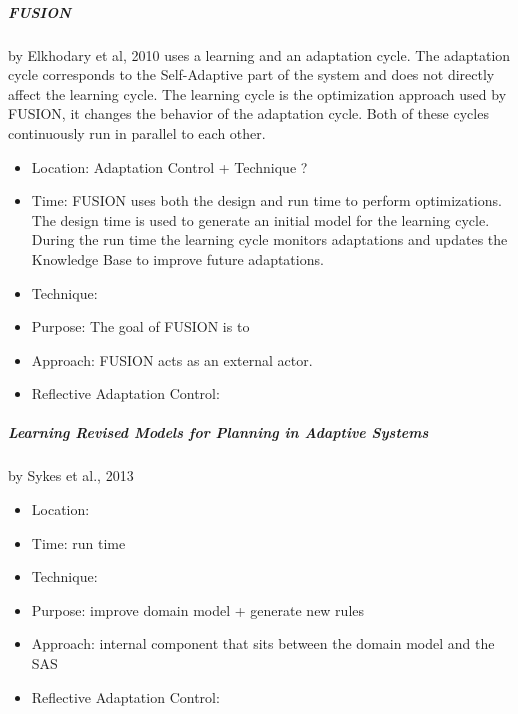 \subparagraph*{FUSION}
by Elkhodary et al, 2010 \cite*{FUSION}  uses a learning and an adaptation cycle.
The adaptation cycle corresponds to the Self-Adaptive part of the system
and does not directly affect the learning cycle.
The learning cycle is the optimization approach used by FUSION,
it changes the behavior of the adaptation cycle.
Both of these cycles continuously run in parallel to each other.
\begin{itemize}
    \item Location: Adaptation Control + Technique ?
    \item Time: FUSION uses both the design and run time to perform optimizations.
    The design time is used to generate an initial model for the learning cycle.
    During the run time the learning cycle monitors adaptations
    and updates the Knowledge Base to improve future adaptations.
    \item Technique:
    \item Purpose: The goal of FUSION is to 
    \item Approach: FUSION acts as an external actor.
    \item Reflective Adaptation Control: 
\end{itemize}

\subparagraph*{Learning Revised Models for Planning in Adaptive Systems}
by Sykes et al., 2013 \cite*{LearningRevisedModels}
\begin{itemize}
    \item Location: 
    \item Time: run time
    \item Technique:
    \item Purpose: improve domain model + generate new rules
    \item Approach: internal component that sits between the domain model and the SAS
    \item Reflective Adaptation Control: 
\end{itemize}